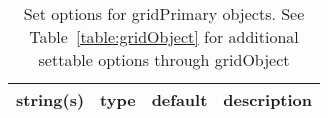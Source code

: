 \begin{table}[ht]
\centering
\begin{tabular}{p{5cm} c c p{7cm}}
\hline
string(s) & type & default & description \\
\hline
\hline
\end{tabular}
\caption{Set options for gridPrimary objects. See Table~\ref{table:gridObject} for additional settable options through gridObject}
\label{table:gridPrimary}
\end{table}

